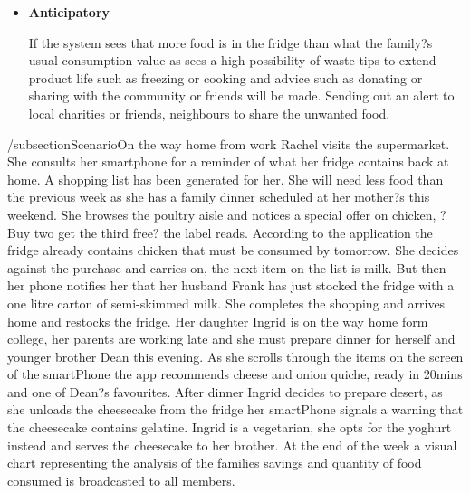 \documentclass[a4paper, 11pt]{article}
\begin{document}
\begin{itemize}
  \item[] \textbf{Anticipatory} 
    \begin{flushleft}\justify If the system sees that more food is in the fridge than what the family?s usual consumption value as sees a high possibility of waste tips to extend product life such as freezing or cooking and advice such as donating or sharing with the community or friends will be made. Sending out an alert to local charities or friends, neighbours to share the unwanted food. 
\end{flushleft}
\end{itemize}


/subsection{Scenario}On the way home from work Rachel visits the supermarket. She consults her smartphone for a reminder of what her fridge contains back at home. A shopping list has been generated for her. She will need less food than the previous week as she has a family dinner scheduled at her mother?s this weekend. She browses the poultry aisle and notices a special offer on chicken, ?Buy two get the third free? the label reads. According to the application the fridge already contains chicken that must be consumed by tomorrow. She decides against the purchase and carries on, the next item on the list is milk. But then her phone notifies her that her husband Frank has just stocked the fridge with a one litre carton of semi-skimmed milk. She completes the shopping and arrives home and restocks the fridge. Her daughter Ingrid is on the way home form college, her parents are working late and she must prepare dinner for herself and younger brother Dean this evening. As she scrolls through the items on the screen of the smartPhone the app recommends cheese and onion quiche, ready in 20mins and one of Dean?s favourites. After dinner Ingrid decides to prepare desert, as she unloads the cheesecake from the fridge her smartPhone signals a warning that the cheesecake contains gelatine. Ingrid is a vegetarian, she opts for the yoghurt instead and serves the cheesecake to her brother. At the end of the week a visual chart representing the analysis of the families savings and quantity of food consumed is broadcasted to all members.
\end{document}
